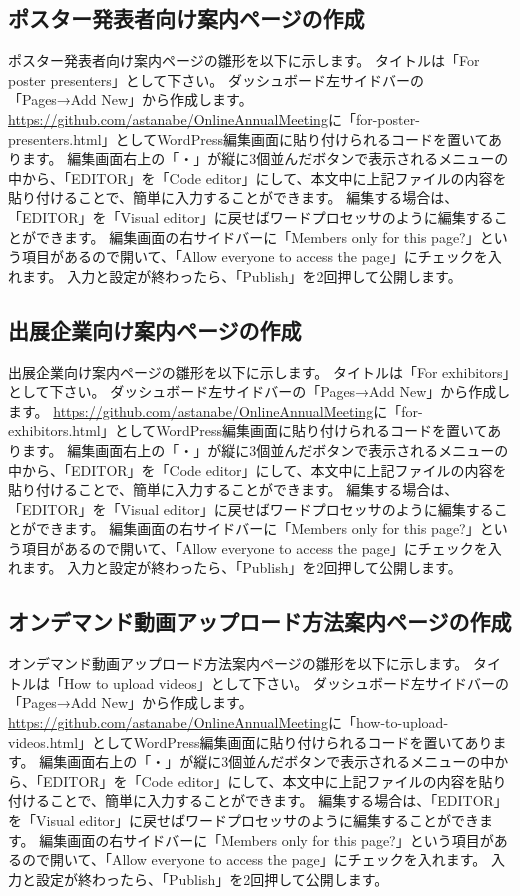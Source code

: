 \documentclass[titlepage,10pt,a4paper,uplatex]{jsbook}
\begin{document}
\subsection{ポスター発表者向け案内ページの作成}

ポスター発表者向け案内ページの雛形を以下に示します。
タイトルは「For poster presenters」として下さい。
ダッシュボード左サイドバーの「Pages→Add New」から作成します。
\url{https://github.com/astanabe/OnlineAnnualMeeting}に「for-poster-presenters.html」としてWordPress編集画面に貼り付けられるコードを置いてあります。
編集画面右上の「・」が縦に3個並んだボタンで表示されるメニューの中から、「EDITOR」を「Code editor」にして、本文中に上記ファイルの内容を貼り付けることで、簡単に入力することができます。
編集する場合は、「EDITOR」を「Visual editor」に戻せばワードプロセッサのように編集することができます。
編集画面の右サイドバーに「Members only for this page?」という項目があるので開いて、「Allow everyone to access the page」にチェックを入れます。
入力と設定が終わったら、「Publish」を2回押して公開します。

\subsection{出展企業向け案内ページの作成}

出展企業向け案内ページの雛形を以下に示します。
タイトルは「For exhibitors」として下さい。
ダッシュボード左サイドバーの「Pages→Add New」から作成します。
\url{https://github.com/astanabe/OnlineAnnualMeeting}に「for-exhibitors.html」としてWordPress編集画面に貼り付けられるコードを置いてあります。
編集画面右上の「・」が縦に3個並んだボタンで表示されるメニューの中から、「EDITOR」を「Code editor」にして、本文中に上記ファイルの内容を貼り付けることで、簡単に入力することができます。
編集する場合は、「EDITOR」を「Visual editor」に戻せばワードプロセッサのように編集することができます。
編集画面の右サイドバーに「Members only for this page?」という項目があるので開いて、「Allow everyone to access the page」にチェックを入れます。
入力と設定が終わったら、「Publish」を2回押して公開します。

\subsection{オンデマンド動画アップロード方法案内ページの作成}

オンデマンド動画アップロード方法案内ページの雛形を以下に示します。
タイトルは「How to upload videos」として下さい。
ダッシュボード左サイドバーの「Pages→Add New」から作成します。
\url{https://github.com/astanabe/OnlineAnnualMeeting}に「how-to-upload-videos.html」としてWordPress編集画面に貼り付けられるコードを置いてあります。
編集画面右上の「・」が縦に3個並んだボタンで表示されるメニューの中から、「EDITOR」を「Code editor」にして、本文中に上記ファイルの内容を貼り付けることで、簡単に入力することができます。
編集する場合は、「EDITOR」を「Visual editor」に戻せばワードプロセッサのように編集することができます。
編集画面の右サイドバーに「Members only for this page?」という項目があるので開いて、「Allow everyone to access the page」にチェックを入れます。
入力と設定が終わったら、「Publish」を2回押して公開します。
\end{document}

